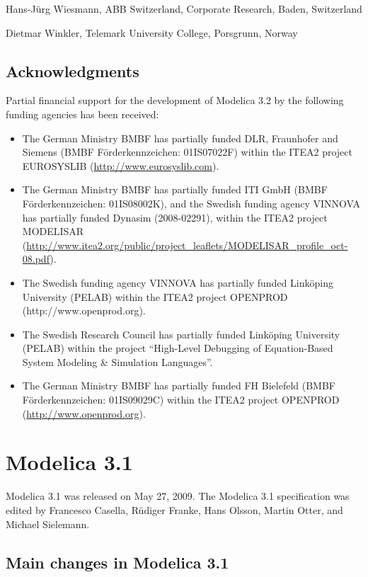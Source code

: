 Hans-Jürg Wiesmann, ABB Switzerland, Corporate Research, Baden,
Switzerland

Dietmar Winkler, Telemark University College, Porsgrunn, Norway

\subsection{Acknowledgments}

Partial financial support for the development of Modelica 3.2 by the
following funding agencies has been received:

\begin{itemize}
\item
  The German Ministry BMBF has partially funded DLR, Fraunhofer and
  Siemens (BMBF Förderkennzeichen: 01IS07022F) within the ITEA2 project
  EUROSYSLIB (\url{http://www.eurosyslib.com}).
\item
  The German Ministry BMBF has partially funded ITI GmbH (BMBF
  Förderkennzeichen: 01IS08002K), and the Swedish funding agency VINNOVA
  has partially funded Dynasim (2008-02291), within the ITEA2 project
  MODELISAR
  (\url{http://www.itea2.org/public/project_leaflets/MODELISAR_profile_oct-08.pdf}).
\item
  The Swedish funding agency VINNOVA has partially funded Linköping
  University (PELAB) within the ITEA2 project OPENPROD
  (http://www.openprod.org).
\item
  The Swedish Research Council has partially funded Linköping University
  (PELAB) within the project ``High-Level Debugging of Equation-Based
  System Modeling \& Simulation Languages''.
\item
  The German Ministry BMBF has partially funded FH Bielefeld (BMBF
  Förderkennzeichen: 01IS09029C) within the ITEA2 project OPENPROD
  (\href{http://www.openprod.}{http://www.openprod.org}).
\end{itemize}

\section{Modelica 3.1}

Modelica 3.1 was released on May 27, 2009. The Modelica 3.1
specification was edited by Francesco Casella, Rüdiger Franke, Hans
Olsson, Martin Otter, and Michael Sielemann.

\subsection{Main changes in Modelica 3.1}

